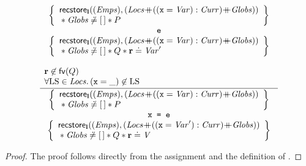 \documentclass{article}
\begin{document}
\begin{lemma}
        \label{lem:recstore:destricvarupdate}
        \[\frac{
        \begin{array}{l}
                \begin{array}{c} 
                        \left\{\begin{array}{l}
                                \recstore_{\ls}((\E{Emps}) , (\E{Locs}{\append}((\js{x}=\E{Var}):\E{Curr}){\append}\E{Globs})) \\
                                {} \sep \E{Globs}\not\doteq{\emptylist} \sep P 
                        \end{array}\right\}\\
                        \js{e}\\
                        \left\{\begin{array}{l}
                                \recstore_{\ls}((\E{Emps}) , (\E{Locs}{\append}((\js{x}=\E{Var}):\E{Curr}){\append}\E{Globs})) \\
                                {}  \sep \E{Globs}\not\doteq{\emptylist}\sep Q \sep \rv\doteq\E{Var}'
                        \end{array}\right\}\\
                \end{array}\\
                \\
                \rv\not\in\fv(Q)\\
                \forall \V{LS}\in\E{Locs} \st (\js{x}=\_)\not\in\V{LS}
        \end{array}
        }{
        \begin{array}{c} 
               \left\{\begin{array}{l} 
                       \recstore_{\ls}((\E{Emps}) , (\E{Locs}{\append}((\js{x}=\E{Var}):\E{Curr}){\append}\E{Globs})) \\
                       {} \sep \E{Globs}\not\doteq{\emptylist} \sep P 
               \end{array}\right\}\\
                \js{x = e}\\
                \left\{\begin{array}{l}
                        \recstore_{\ls}((\E{Emps}) , (\E{Locs}{\append}((\js{x}=\E{Var}'):\E{Curr}){\append}\E{Globs})) \\
                        {} \sep \E{Globs}\not\doteq{\emptylist} \sep Q \sep \rv\doteq\E{V}
                \end{array}\right\}\\
        \end{array}
         }\]
        \begin{proof} The proof follows directly from the assignment and the definition of \recstore. \end{proof}
\end{lemma}
\end{document}
